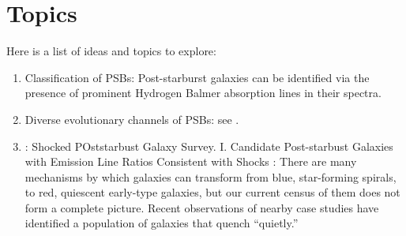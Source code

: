 \section{Topics}
Here is a list of ideas and topics to explore:
\begin{enumerate}
    \item Classification of PSBs: Post-starburst galaxies can be identified via the presence of prominent Hydrogen Balmer absorption lines in their spectra. 
    \item Diverse evolutionary channels of PSBs: see \citet{2019NatAs...3..440P}.
    \item \citet{2016ApJS..224...38A} : Shocked POststarbust Galaxy Survey. I. Candidate Post-starbust Galaxies with Emission Line Ratios Consistent with Shocks : There are many mechanisms by which galaxies can transform from blue, star-forming spirals, to red, quiescent early-type galaxies, but our current census of them does not form a complete picture. Recent observations of nearby case studies have identified a population of galaxies that quench “quietly.” 
\end{enumerate}